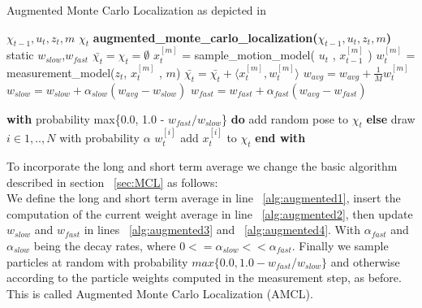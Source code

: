 \documentclass[	DIV=calc,%
							paper=a4,%
							fontsize=9pt,%
							twocolumn]{scrartcl}	 					%
\newcommand{\tab}{\hspace*{2em}} %
\begin{document}
\begin{algorithm}[h!]
\caption{Augmented Monte Carlo Localization as depicted in \cite{ProbabilisticRobotics}}
\label{line}
\begin{algorithmic}[1]
$\chi_{t-1}, u_t, z_t,m$
$\chi_t$
\STATE \textbf{augmented\_monte\_carlo\_localization(}$\chi_{t-1}, u_t, z_t,m$\textbf{)}
\STATE static $w_{slow}$,$ w_{fast}$ \label{alg:augmented1}\;
\STATE $\bar{\chi_t} = \chi_t = \emptyset$\;
\STATE $x^{[m]}_t$ = sample\_motion\_model( $u_t$ , $x^{[m]}_{t-1}$ )\;
\STATE $w^{[m]}_t$ = measurement\_model($z_t$, $x^{[m]}_t$ , $m$)\;
\STATE $\bar{\chi_t} = \bar{\chi_t} + \langle x^{[m]}_t, w^{[m]}_t \rangle $\;
\STATE $w_{avg} = w_{avg} + \frac{1}{M} w^{[m]}_t $ \label{alg:augmented2}
\ENDFOR
\STATE $w_{slow} = w_{slow} + \alpha_{slow}(w_{avg} - w_{slow})$ \label{alg:augmented3}\;
\STATE $w_{fast} = w_{fast} + \alpha_{fast}(w_{avg} - w_{fast})$ \label{alg:augmented4}\;

\STATE \textbf{with} probability max\{0.0, 1.0 - $w_{fast}/w_{slow}$\} \textbf{do}
\STATE \tab add random pose to $\chi_t$
\STATE \textbf{else}
\STATE \tab draw $i\in{1,..,N}$ with probability $\alpha$  $w^{[i]}_t$\;
\STATE \tab add $x^{[i]}_t $ to $\chi_t$\;
\STATE \textbf{end with}
\ENDFOR
\end{algorithmic}
\end{algorithm}


To incorporate the long and short term average we change the basic algorithm described in section ~\ref{sec:MCL} as follows:\\
We define the long and short term average in line ~\ref{alg:augmented1}, insert the computation of the current weight average in line ~\ref{alg:augmented2}, then update $w_{slow}$ and $w_{fast}$ in lines ~\ref{alg:augmented3} and ~\ref{alg:augmented4}. With $\alpha_{fast}$ and $\alpha_{slow}$ being the decay rates, where $0<=\alpha_{slow}<<\alpha_{fast}$. Finally we sample particles at random with probability $max\{0.0,1.0-w_{fast}/w_{slow}\}$ and otherwise according to the particle weights computed in the measurement step, as before.
This is called Augmented Monte Carlo Localization (AMCL).
\end{document}
